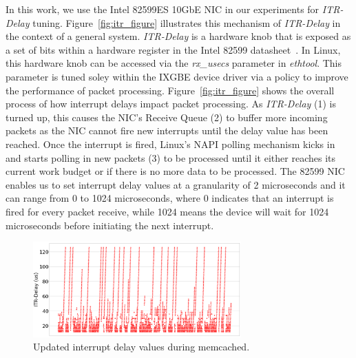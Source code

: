 \documentclass[letterpaper,twocolumn,10pt]{article}
\begin{document}
In this work, we use the Intel 82599ES 10GbE NIC in our experiments for \textit{ITR-Delay} tuning. Figure~\ref{fig:itr_figure} illustrates this mechanism of \textit{ITR-Delay} in the context of a general system. \textit{ITR-Delay} is a hardware knob that is exposed as a set of bits within a hardware register in the Intel 82599 datasheet~\cite{82599}. In Linux, this hardware knob can be accessed via the \textit{rx\_usecs} parameter in \textit{ethtool}. This parameter is tuned soley within the IXGBE device driver via a policy to improve the performance of packet processing. Figure~\ref{fig:itr_figure} shows the overall process of how interrupt delays impact packet processing.
As \textit{ITR-Delay} (1) is turned up, this causes the NIC's Receive Queue (2) to buffer more incoming packets as the NIC cannot fire new interrupts until the delay value has been reached.
Once the interrupt is fired, Linux's NAPI polling mechanism kicks in and starts polling in new packets (3) to be processed until it either reaches its current work budget or if there is no more data to be processed. The 82599 NIC enables us to set interrupt delay values at a granularity of 2 microseconds and it can range from 0 to 1024 microseconds, where 0 indicates that an interrupt is fired for every packet receive, while 1024 means the device will wait for 1024 microseconds before initiating the next interrupt.

\begin{figure}
  \includegraphics[width=8cm]{itr_delays.png}
  \caption{Updated interrupt delay values during memcached.}
  \label{fig:itr_delays}
\end{figure}
\end{document}
